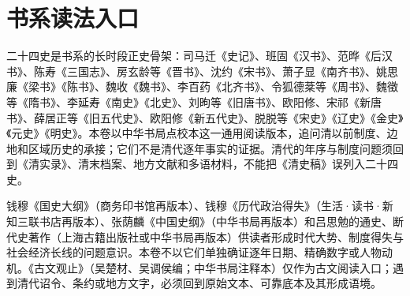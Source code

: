 \begin{description}
\end{description}

\section{书系读法入口}

二十四史是书系的长时段正史骨架：司马迁《史记》、班固《汉书》、范晔《后汉书》、陈寿《三国志》、房玄龄等《晋书》、沈约《宋书》、萧子显《南齐书》、姚思廉《梁书》《陈书》、魏收《魏书》、李百药《北齐书》、令狐德棻等《周书》、魏徵等《隋书》、李延寿《南史》《北史》、刘昫等《旧唐书》、欧阳修、宋祁《新唐书》、薛居正等《旧五代史》、欧阳修《新五代史》、脱脱等《宋史》《辽史》《金史》《元史》《明史》。本卷以中华书局点校本这一通用阅读版本，追问清以前制度、边地和区域历史的承接；它们不是清代逐年事实的证据。清代的年序与制度问题须回到《清实录》、清末档案、地方文献和多语材料，不能把《清史稿》误列入二十四史。

钱穆《国史大纲》（商务印书馆再版本）、钱穆《历代政治得失》（生活·读书·新知三联书店再版本）、张荫麟《中国史纲》（中华书局再版本）和吕思勉的通史、断代史著作（上海古籍出版社或中华书局再版本）供读者形成时代大势、制度得失与社会经济长线的问题意识。本卷不以它们单独确证逐年日期、精确数字或人物动机。《古文观止》（吴楚材、吴调侯编；中华书局注释本）仅作为古文阅读入口；遇到清代诏令、条约或地方文字，必须回到原始文本、可靠底本及其形成语境。
